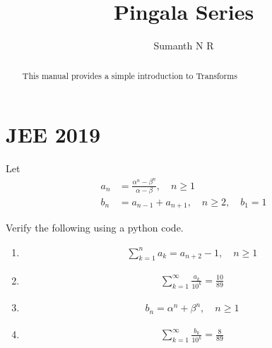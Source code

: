 \documentclass[journal,12pt,twocolumn]{IEEEtran}
\renewcommand\thesection{\arabic{section}}
\begin{document}
\let\StandardTheFigure\thefigure
\renewcommand{\thefigure}{\theproblem}

\def\putbox#1#2#3{\makebox[0in][l]{\makebox[#1][l]{}\raisebox{\baselineskip}[0in][0in]{\raisebox{#2}[0in][0in]{#3}}}}
\def\rightbox#1{\makebox[0in][r]{#1}}
\def\centbox#1{\makebox[0in]{#1}}
\def\topbox#1{\raisebox{-\baselineskip}[0in][0in]{#1}}
\def\midbox#1{\raisebox{-0.5\baselineskip}[0in][0in]{#1}}

\vspace{3cm}

\title{ Pingala Series }
\author{ Sumanth N R }
\maketitle

\tableofcontents

\renewcommand{\thefigure}{\theenumi}
\renewcommand{\thetable}{\theenumi}

\bigskip

\begin{abstract}
This manual provides a simple introduction to Transforms
\end{abstract}



\section{JEE 2019}
Let 
\begin{align}
	a_n &= \frac{\alpha^{n}-\beta^{n}}{\alpha - \beta}, \quad n \ge 1 \\
	b_n &= a_{n-1} + a_{n+1}, \quad n \ge 2, \quad b_1 =1
	\label{eq:10-orig-diff}
\end{align}

Verify the following using a python code.

\begin{enumerate}[label=\thesection.\arabic*,ref=\thesection.\theenumi]
\item \begin{align}
	\sum_{k=1}^{n}a_k = a_{n+2}-1, \quad n \ge 1
\end{align}
\item \begin{align}
	\sum_{k=1}^{\infty}\frac{a_k}{10^k} =\frac{10}{89}
\end{align}
\item \begin{align}
	b_n =\alpha^n + \beta^n, \quad n \ge 1
\end{align}
\item \begin{align}
	\sum_{k=1}^{\infty}\frac{b_k}{10^k} =\frac{8}{89}
\end{align}
\end{enumerate}
\end{document}
